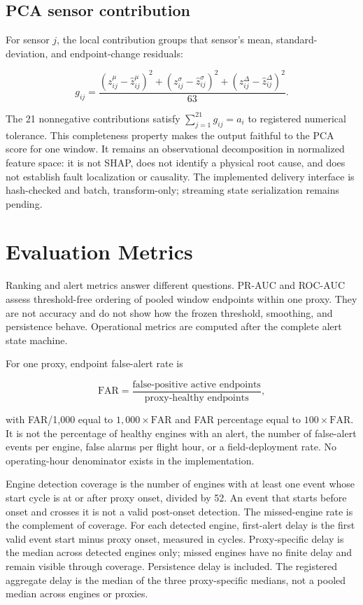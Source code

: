 \documentclass[11pt]{article}
\begin{document}
\subsection{PCA sensor contribution}


For sensor $j$, the local contribution groups that sensor's mean, standard-deviation, and endpoint-change residuals:


\[

g_{ij}=\frac{(z_{ij}^{\mu}-\hat z_{ij}^{\mu})^2+(z_{ij}^{\sigma}-\hat z_{ij}^{\sigma})^2+(z_{ij}^{\Delta}-\hat z_{ij}^{\Delta})^2}{63}.
\]


The 21 nonnegative contributions satisfy $\sum_{j=1}^{21}g_{ij}=a_i$ to registered numerical tolerance. This completeness property makes the output faithful to the PCA score for one window. It remains an observational decomposition in normalized feature space: it is not SHAP, does not identify a physical root cause, and does not establish fault localization or causality. The implemented delivery interface is hash-checked and batch, transform-only; streaming state serialization remains pending.


\section{Evaluation Metrics}


Ranking and alert metrics answer different questions. PR-AUC and ROC-AUC assess threshold-free ordering of pooled window endpoints within one proxy. They are not accuracy and do not show how the frozen threshold, smoothing, and persistence behave. Operational metrics are computed after the complete alert state machine.


For one proxy, endpoint false-alert rate is


\[

\mathrm{FAR}=\frac{\text{false-positive active endpoints}}{\text{proxy-healthy endpoints}},
\]


with FAR/1,000 equal to $1{,}000\times\mathrm{FAR}$ and FAR percentage equal to $100\times\mathrm{FAR}$. It is not the percentage of healthy engines with an alert, the number of false-alert events per engine, false alarms per flight hour, or a field-deployment rate. No operating-hour denominator exists in the implementation.


Engine detection coverage is the number of engines with at least one event whose start cycle is at or after proxy onset, divided by 52. An event that starts before onset and crosses it is not a valid post-onset detection. The missed-engine rate is the complement of coverage. For each detected engine, first-alert delay is the first valid event start minus proxy onset, measured in cycles. Proxy-specific delay is the median across detected engines only; missed engines have no finite delay and remain visible through coverage. Persistence delay is included. The registered aggregate delay is the median of the three proxy-specific medians, not a pooled median across engines or proxies.
\end{document}
